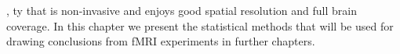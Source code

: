 


\vspace*{\fill}
,%
ty that is non-invasive and enjoys good spatial resolution and full brain coverage. In this chapter we present the statistical methods that will be used for drawing conclusions from fMRI experiments in further chapters. 







